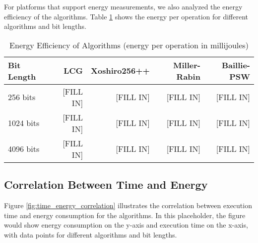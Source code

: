 For platforms that support energy measurements, we also analyzed the energy efficiency of the algorithms. Table \ref{tab:energy_efficiency} shows the energy per operation for different algorithms and bit lengths.

\begin{table}[H]
\centering
\caption{Energy Efficiency of Algorithms (energy per operation in millijoules)}
\label{tab:energy_efficiency}
\begin{tabular}{@{}lrrrr@{}}
\toprule
\textbf{Bit Length} & \textbf{LCG} & \textbf{Xoshiro256++} & \textbf{Miller-Rabin} & \textbf{Baillie-PSW} \\
\midrule
256 bits    & [FILL IN] & [FILL IN] & [FILL IN] & [FILL IN] \\
1024 bits   & [FILL IN] & [FILL IN] & [FILL IN] & [FILL IN] \\
4096 bits   & [FILL IN] & [FILL IN] & [FILL IN] & [FILL IN] \\
\bottomrule
\end{tabular}
\end{table}

\subsection{Correlation Between Time and Energy}

Figure \ref{fig:time_energy_correlation} illustrates the correlation between execution time and energy consumption for the algorithms. In this placeholder, the figure would show energy consumption on the y-axis and execution time on the x-axis, with data points for different algorithms and bit lengths.

